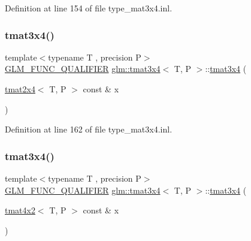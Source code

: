 Definition at line 154 of file type\+\_\+mat3x4.\+inl.

\mbox{\label{structglm_1_1tmat3x4_adb7f132c93b8d8fcdbd577898d77f7b8}} 
\subsubsection{\texorpdfstring{tmat3x4()}{tmat3x4()}\hspace{0.1cm}{\footnotesize\ttfamily [16/22]}}
{\footnotesize\ttfamily template$<$typename T , precision P$>$ \\
\mbox{\hyperlink{setup_8hpp_a33fdea6f91c5f834105f7415e2a64407}{G\+L\+M\+\_\+\+F\+U\+N\+C\+\_\+\+Q\+U\+A\+L\+I\+F\+I\+ER}} \mbox{\hyperlink{structglm_1_1tmat3x4}{glm\+::tmat3x4}}$<$ T, P $>$\+::\mbox{\hyperlink{structglm_1_1tmat3x4}{tmat3x4}} (\begin{DoxyParamCaption}\item[{\mbox{\hyperlink{structglm_1_1tmat2x4}{tmat2x4}}$<$ T, P $>$ const \&}]{x }\end{DoxyParamCaption})}



Definition at line 162 of file type\+\_\+mat3x4.\+inl.

\mbox{\label{structglm_1_1tmat3x4_a70babe3ae60656b3cbe053ef31327e13}} 
\subsubsection{\texorpdfstring{tmat3x4()}{tmat3x4()}\hspace{0.1cm}{\footnotesize\ttfamily [17/22]}}
{\footnotesize\ttfamily template$<$typename T , precision P$>$ \\
\mbox{\hyperlink{setup_8hpp_a33fdea6f91c5f834105f7415e2a64407}{G\+L\+M\+\_\+\+F\+U\+N\+C\+\_\+\+Q\+U\+A\+L\+I\+F\+I\+ER}} \mbox{\hyperlink{structglm_1_1tmat3x4}{glm\+::tmat3x4}}$<$ T, P $>$\+::\mbox{\hyperlink{structglm_1_1tmat3x4}{tmat3x4}} (\begin{DoxyParamCaption}\item[{\mbox{\hyperlink{structglm_1_1tmat4x2}{tmat4x2}}$<$ T, P $>$ const \&}]{x }\end{DoxyParamCaption})}



